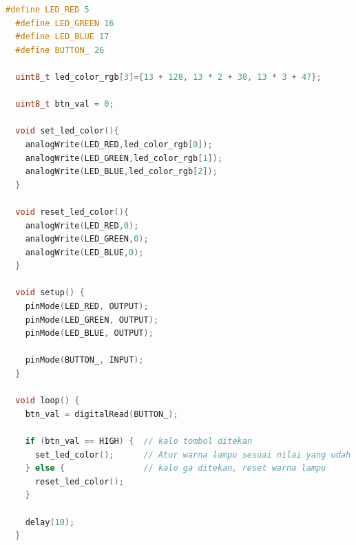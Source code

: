 \begin{enumerate}
  \begin{lstlisting}[language=C++, caption= Kode yang disimulasikan]
  #define LED_RED 5
  #define LED_GREEN 16
  #define LED_BLUE 17
  #define BUTTON_ 26

  uint8_t led_color_rgb[3]={13 + 128, 13 * 2 + 38, 13 * 3 + 47};

  uint8_t btn_val = 0;

  void set_led_color(){
    analogWrite(LED_RED,led_color_rgb[0]);
    analogWrite(LED_GREEN,led_color_rgb[1]);
    analogWrite(LED_BLUE,led_color_rgb[2]);
  }

  void reset_led_color(){
    analogWrite(LED_RED,0);
    analogWrite(LED_GREEN,0);
    analogWrite(LED_BLUE,0);
  }

  void setup() {
    pinMode(LED_RED, OUTPUT);
    pinMode(LED_GREEN, OUTPUT);
    pinMode(LED_BLUE, OUTPUT);

    pinMode(BUTTON_, INPUT);
  }

  void loop() {
    btn_val = digitalRead(BUTTON_);

    if (btn_val == HIGH) {  // kalo tombol ditekan
      set_led_color();      // Atur warna lampu sesuai nilai yang udah ditentuin
    } else {                // kalo ga ditekan, reset warna lampu
      reset_led_color();
    }

    delay(10); 
  }
  \end{lstlisting}
  

\end{enumerate}

